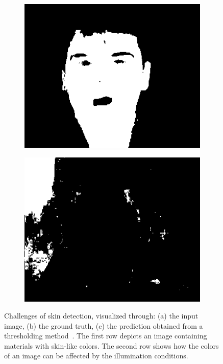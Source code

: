 \begin{figure}[h]
     \hfill
     \begin{subfigure}[b]{0.3\textwidth}
         \centering
         \includegraphics[width=\textwidth]{images/introduction/im00081y.png}
         \caption{}
         \label{fig:thresh-color-y}
     \end{subfigure}
     \hfill
     \begin{subfigure}[b]{0.3\textwidth}
         \centering
         \includegraphics[width=\textwidth]{images/introduction/im00081p.png}
         \caption{}
         \label{fig:thresh-color-p}
     \end{subfigure}
        \caption{Challenges of skin detection, visualized through: (a) the input image, (b) the ground truth, (c) the prediction obtained from a thresholding method~\cite{brancati2017human}.
        The first row depicts an image containing materials with skin-like colors. The second row shows how the colors of an image can be affected by the illumination conditions.}
        \label{fig:common-issues}
\end{figure}

